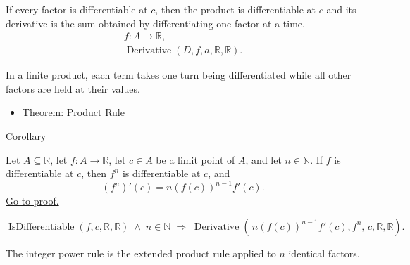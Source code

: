 \begin{remark*}
If every factor is differentiable at $c$, then the product is differentiable
at $c$ and its derivative is the sum obtained by differentiating one factor at
a time.
\[
\begin{aligned}
  f\colon A\to\mathbb{R},\\
  \operatorname{Derivative}(D,f,a,\mathbb{R},\mathbb{R}).
\end{aligned}
\]
\end{remark*}

\begin{remark*}[Interpretation]
In a finite product, each term takes one turn being differentiated while all other factors are held at their values.
\end{remark*}

\begin{dependencies}
\begin{itemize}
  \item \hyperref[thm:product-rule]{Theorem: Product Rule}
\end{itemize}
\end{dependencies}


\begin{corollarybox}{Corollary}
\begin{corollary}
\label{cor:power-rule-special-case}
Let $A \subseteq \mathbb{R}$, let $f : A \to \mathbb{R}$, let $c \in A$ be a limit point of $A$, and let $n \in \mathbb{N}$. If $f$ is differentiable at $c$, then $f^n$ is differentiable at $c$, and
\[
(f^n)'(c) = n(f(c))^{n-1}f'(c).
\]
\hyperref[prf:power-rule-special-case]{Go to proof.}
\end{corollary}
\end{corollarybox}

\begin{remark*}
\[
\operatorname{IsDifferentiable}(f,c,\mathbb{R},\mathbb{R}) \;\land\; n \in \mathbb{N}
\;\Rightarrow\;
\operatorname{Derivative}(\,n(f(c))^{n-1}f'(c),f^n,\,c,\mathbb{R},\mathbb{R}).
\]
\end{remark*}

\begin{remark*}[Interpretation]
The integer power rule is the extended product rule applied to $n$ identical factors.
\end{remark*}

